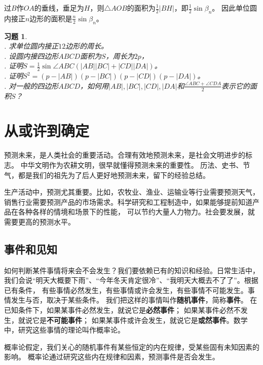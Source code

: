 \documentclass[12pt,UTF8]{ctexbook}
\newtheorem{xt}{习题}[section]
\begin{document}
过$B$作$OA$的垂线，垂足为$H$，则$\triangle AOB$的面积为$\frac12 |BH|$，即$\frac12 \sin{\beta_n}$。
因此单位圆内接正$n$边形的面积是$\frac{n}{2} \sin{\beta_n}$。

\begin{xt}\label{xt:2-6-10}
    \mbox{} \\
    . 求单位圆内接正$12$边形的周长。\\
    . 设圆内接四边形$ABCD$面积为$S$，周长为$2p$，\\
    . 证明$S = \frac12 \sin \angle ABC (|AB||BC| + |CD||DA|)$。 \\
    . 证明$S^2 = (p - |AB|)(p - |BC|)(p - |CD|)(p - |DA|)$。\\
    . 对一般的四边形$ABCD$，如何用$|AB|, |BC|, |CD|, |DA|$和$\frac{\angle ABC + \angle CDA}{2}$表示它的面积$S$？
\end{xt}

\chapter{从或许到确定}
预测未来，是人类社会的重要活动。合理有效地预测未来，是社会文明进步的标志。
中华文明作为农耕文明，很早就懂得预测未来的重要性。
历法、史书、节气，都是我们的祖先为了后人更好地预测未来，留下的经验总结。

生产活动中，预测尤其重要。比如，农牧业、渔业、运输业等行业需要预测天气，
销售行业需要预测产品的市场需求。科学研究和工程制造中，如果能够提前知道产品在各种各样的情境和场景下的性能，
可以节约大量人力物力。社会要发展，就需要更高的预测水平。

\section{事件和见知}

如何判断某件事情将来会不会发生？我们要依赖已有的知识和经验。日常生活中，
我们会说“明天大概要下雨”、“今年冬天肯定很冷”、“我明天大概去不了了”。根据已有条件，
有些事情必然发生，有些事情或许会发生，有些事情不可能发生。事情发生与否，取决于某些条件。
我们把这样的事情叫作\textbf{随机事件}，简称\textbf{事件}。
在已知条件下，如果某事件必然发生，就说它是\textbf{必然事件}；
如果某事件必然不发生，就说它是\textbf{不可能事件}；
如果某事件或许会发生，就说它是\textbf{或然事件}。数学中，研究这些事情的理论叫作概率论。

概率论假定，我们关心的随机事件有某些恒定的内在规律，受某些固有未知因素的影响。
概率论通过研究这些内在规律和因素，预测事件是否会发生。
\end{document}

